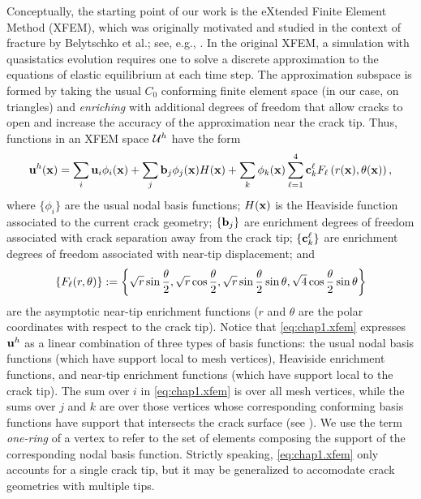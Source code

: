 Conceptually, the starting point of our work is the eXtended Finite Element Method \linebreak[4] (XFEM), which was originally motivated and studied in the context of fracture by Belytschko et al.; see, e.g., \cite{Moes99}. In the original XFEM, a simulation with quasistatics evolution requires one to solve a discrete approximation to the equations of elastic equilibrium at each time step. The approximation subspace is formed by taking the usual $C_0$ conforming finite element space (in our case, on triangles) and \emph{enriching} with additional degrees of freedom that allow cracks to open and increase the accuracy of the approximation near the crack tip. Thus, functions in an XFEM space $\mathcal{U}^h$  have the form
\begin{equation} \label{eq:chap1.xfem}
\mathbf{u}^h(\mathbf{x}) = \sum_i \mathbf{u}_i \phi_i(\mathbf{x}) + \sum_j \mathbf{b}_j \phi_j(\mathbf{x}) H(\mathbf{x}) + \sum_k \phi_k(\mathbf{x}) \sum_{\ell = 1}^4 \mathbf{c}_k^{\ell} F_{\ell} \left( r(\mathbf{x}), \theta(\mathbf{x}) \right),
\end{equation}
where $\{\phi_i\}$ are the usual nodal basis functions; $H(\mathbf{x})$ is the Heaviside function associated to the current crack geometry; $\{\mathbf{b}_j\}$ are enrichment degrees of freedom associated with crack separation away from the crack tip; $ \{\mathbf{c}_k^\ell\}$ are enrichment degrees of freedom associated with near-tip displacement; and
\begin{equation*}
\left\lbrace F_{\ell}(r,\theta) \right\rbrace := \left\lbrace  \sqrt{r} \sin \frac{\theta}{2}, \sqrt{r} \cos \frac{\theta}{2}, \sqrt{r} \sin \frac{\theta}{2} \sin \theta, \sqrt{4} \cos \frac{\theta}{2} \sin \theta  \right\rbrace
\end{equation*}
are the asymptotic near-tip enrichment functions ($r$ and $\theta$ are the polar coordinates with respect to the crack tip). Notice that \eqref{eq:chap1.xfem} expresses $\mathbf{u}^h$ as a linear combination of three types of basis functions: the usual nodal basis functions (which have support local to mesh vertices), Heaviside enrichment functions, and near-tip enrichment functions (which have support local to the crack tip). The sum over $i$ in \eqref{eq:chap1.xfem} is over all mesh vertices, while the sums over $j$ and $k$ are over those vertices whose corresponding conforming basis functions have support that intersects the crack surface (see \cite{Moes99}). We use the term \emph{one-ring} of a vertex to refer to the set of elements composing the support of the corresponding nodal basis function. Strictly speaking, \eqref{eq:chap1.xfem} only accounts for a single crack tip, but it may be generalized to accomodate crack geometries with multiple tips.

